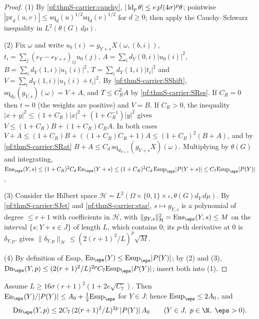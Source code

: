 \begin{proof}
(1) By \cref{pf:thmS-carrier:cauchy}, $|\operatorname{ld}_p\theta|\le e\,p!(4\sigma)^p\theta$; pointwise
$|\mathrm{pr}_d(u,v)|\le\mathrm{sq}_d(u)^{1/2}\mathrm{sq}_d(v)^{1/2}$ for $d\ge0$; then apply the Cauchy--Schwarz inequality in
$L^2(\theta(G)\,d\mu)$.

(2) Fix $\omega$ and write $u_b(i)=g_{Y+s}X(\omega,(b,i))$, $t_i=\sum_j(e_Y-e_{Y+s})_{ij}u_0(j)$, $A=\sum_id_Y(0,i)|u_0(i)|^2$,
$B=\sum_id_Y(1,i)|u_1(i)|^2$, $T=\sum_id_Y(1,i)|t_i|^2$ and $V=\sum_id_Y(1,i)|u_1(i)+t_i|^2$. By \ref{pf:thmS-carrier:SShift},
$\mathrm{sq}_{d_Y}(g_{Y,s})(\omega)=V+A$, and $T\le C_R^2A$ by \ref{pf:thmS-carrier:SRes}. If $C_R=0$ then $t=0$ (the weights
are positive) and $V=B$. If $C_R>0$, the inequality $|x+y|^2\le(1+C_R)|x|^2+(1+C_R^{-1})|y|^2$ gives
$V\le(1+C_R)B+(1+C_R)C_RA$. In both cases $V+A\le(1+C_R)B+((1+C_R)C_R+1)A\le(1+C_R)^2(B+A)$, and by
\ref{pf:thmS-carrier:SRat} $B+A\le C_d\,\mathrm{sq}_{d_{Y+s}}(g_{Y+s}X)(\omega)$. Multiplying by $\theta(G)$ and integrating,
$\mathrm{Ens}_\eps(Y,s)\le(1+C_R)^2C_d\,\mathrm{En}_\eps(Y+s)\le(1+C_R)^2C_d\,\mathrm{Esup}_\eps|P(Y+s)|\le
C_7\mathrm{Esup}_\eps|P(Y)|$.

(3) Consider the Hilbert space $\mathcal H=L^2(\Omega\times\{0,1\}\times\iota,\theta(G)d_Y\,d\mu)$. By
\ref{pf:thmS-carrier:SJet} and \cref{pf:thmS-carrier:star}, $s\mapsto g_{Y,s}$ is a polynomial of degree $\le r+1$ with
coefficients in $\mathcal H$, with $\|g_{Y,s}\|^2_{\mathcal H}=\mathrm{Ens}_\eps(Y,s)\le M$ on the interval $\{s:Y+s\in J\}$ of
length $L$, which contains $0$; its $p$-th derivative at $0$ is $\delta_{Y,p}$.  gives
$\|\delta_{Y,p}\|_{\mathcal H}\le(2(r+1)^2/L)^p\sqrt M$.

(4) By definition of $\mathrm{Esup}$, $\mathrm{En}_\eps(Y)\le\mathrm{Esup}_\eps|P(Y)|$; by (2) and (3),
$\mathrm{Dn}_\eps(Y,p)\le(2(r+1)^2/L)^{2p}C_7\mathrm{Esup}_\eps|P(Y)|$; insert both into (1).
\end{proof}

\begin{lemma}[Absorption]\label{pf:thmS-carrier:absorb}
Assume $L\ge16\sigma(r+1)^2(1+2e\sqrt{C_7})$. Then $\mathrm{En}_\eps(Y)/|P(Y)|\le A_0+\frac12\mathrm{Esup}_\eps$ for $Y\in J$;
hence $\mathrm{Esup}_\eps\le2A_0$, and
\[
\mathrm{Dn}_\eps(Y,p)\le2C_7\,(2(r+1)^2/L)^{2p}\,|P(Y)|\,A_0\qquad(Y\in J,\ p\in\N,\ \eps>0).
\]
\end{lemma}

